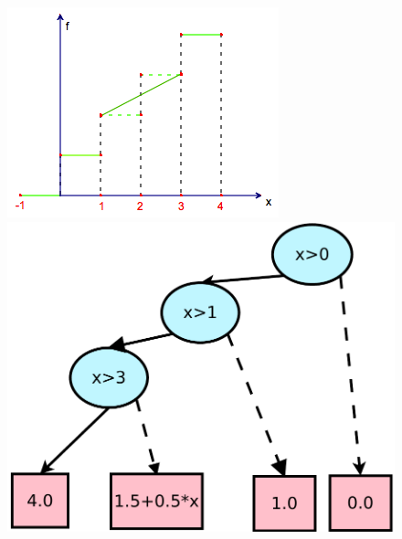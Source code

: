 \begin{figure}[!ht]
{\begin{minipage}{.25\textwidth}
	\includegraphics[width=\textwidth]{Figures/stepfun/succ2.png}
	\end{minipage}
	\begin{minipage}{.2\textwidth}
	\includegraphics[width=\textwidth]{Figures/xadds/succ2.pdf}
	\end{minipage}
	\label{step1} 
}
\end{figure}
